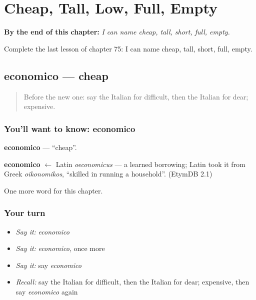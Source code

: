 
\chapter{Cheap, Tall, Low, Full, Empty}
\label{ch:it-cheap-tall-low-full-empty}

\begin{chapteropening}
\textbf{By the end of this chapter:} \emph{I can name cheap, tall, short, full, empty.}

Complete the last lesson of chapter 75: I can name cheap, tall, short, full, empty.
\end{chapteropening}

\section[economico]{economico — cheap}

\label{lesson:IT-C75-economico}



\begin{quote}
Before the new one: say the Italian for difficult, then the Italian for dear; expensive.
\end{quote}

\subsection*{You'll want to know: economico}
\textbf{economico} — \textquotedblleft{}cheap\textquotedblright{}.

\begin{cousinweb}
\textbf{economico} $\leftarrow$ Latin \emph{oeconomicus} — a learned borrowing; Latin took it from Greek \emph{oikonomikos}, \textquotedblleft{}skilled in running a household\textquotedblright{}. (EtymDB 2.1)
\end{cousinweb}

\begin{grammarlens}[title={What you've built}]
One more word for this chapter.
\end{grammarlens}

\subsection*{Your turn}
\begin{itemize}
\raggedright
  \item \emph{Say it:} \emph{economico}
  \item \emph{Say it:} \emph{economico}, once more
  \item \emph{Say it:} say \emph{economico}
  \item \emph{Recall:} say the Italian for difficult, then the Italian for dear; expensive, then say \emph{economico} again
\end{itemize}

